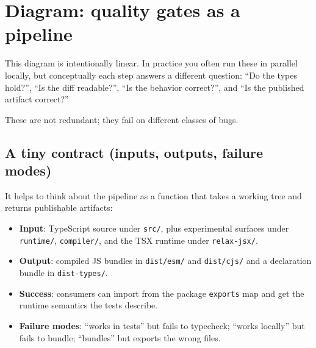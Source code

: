 \section*{Diagram: quality gates as a pipeline}
\begin{center}
\end{center}

This diagram is intentionally linear. In practice you often run these in parallel locally, but conceptually each step answers a different question: ``Do the types hold?'', ``Is the diff readable?'', ``Is the behavior correct?'', and ``Is the published artifact correct?''

These are not redundant; they fail on different classes of bugs.

\subsection{A tiny contract (inputs, outputs, failure modes)}

It helps to think about the pipeline as a function that takes a working tree and returns publishable artifacts:

\begin{itemize}
\item \textbf{Input}: TypeScript source under \texttt{src/}, plus experimental surfaces under \texttt{runtime/}, \texttt{compiler/}, and the TSX runtime under \texttt{relax-jsx/}.
\item \textbf{Output}: compiled JS bundles in \texttt{dist/esm/} and \texttt{dist/cjs/} and a declaration bundle in \texttt{dist-types/}.
\item \textbf{Success}: consumers can import from the package \texttt{exports} map and get the runtime semantics the tests describe.
\item \textbf{Failure modes}: ``works in tests'' but fails to typecheck; ``works locally'' but fails to bundle; ``bundles'' but exports the wrong files.
\end{itemize}

